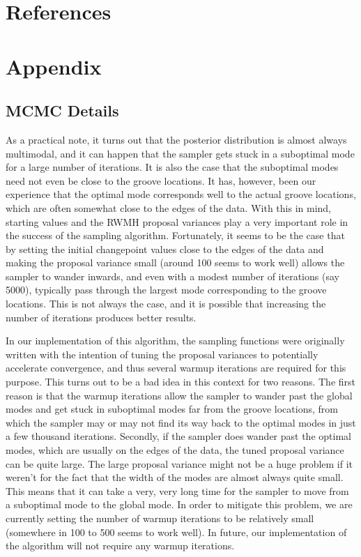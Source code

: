 \documentclass[12pt]{article}
\begin{document}
\section{References}

\section{Appendix}

\subsection{MCMC Details}

As a practical note, it turns out that the posterior distribution is
almost always multimodal, and it can happen that the sampler gets stuck
in a suboptimal mode for a large number of iterations. It is also the
case that the suboptimal modes need not even be close to the groove
locations. It has, however, been our experience that the optimal mode
corresponds well to the actual groove locations, which are often
somewhat close to the edges of the data. With this in mind, starting
values and the RWMH proposal variances play a very important role in the
success of the sampling algorithm. Fortunately, it seems to be the case
that by setting the initial changepoint values close to the edges of the
data and making the proposal variance small (around 100 seems to work
well) allows the sampler to wander inwards, and even with a modest
number of iterations (say 5000), typically pass through the largest mode
corresponding to the groove locations. This is not always the case, and
it is possible that increasing the number of iterations produces better
results.

In our implementation of this algorithm, the sampling functions were
originally written with the intention of tuning the proposal variances
to potentially accelerate convergence, and thus several warmup
iterations are required for this purpose. This turns out to be a bad
idea in this context for two reasons. The first reason is that the
warmup iterations allow the sampler to wander past the global modes and
get stuck in suboptimal modes far from the groove locations, from which
the sampler may or may not find its way back to the optimal modes in
just a few thousand iterations. Secondly, if the sampler does wander
past the optimal modes, which are usually on the edges of the data, the
tuned proposal variance can be quite large. The large proposal variance
might not be a huge problem if it weren't for the fact that the width of
the modes are almost always quite small. This means that it can take a
very, very long time for the sampler to move from a suboptimal mode to
the global mode. In order to mitigate this problem, we are currently
setting the number of warmup iterations to be relatively small
(somewhere in 100 to 500 seems to work well). In future, our
implementation of the algorithm will not require any warmup iterations.
\end{document}

